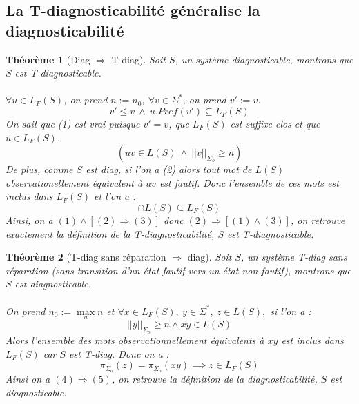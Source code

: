 \documentclass[conference]{IEEEtran}
\newtheorem{myth}{Th\'eor\`eme}
\begin{document}
\subsection{La T-diagnosticabilité généralise la diagnosticabilité}

\begin{myth}[Diag $\Rightarrow$ T-diag]

Soit $S$, un système diagnosticable, montrons que $S$ est T-diagnosticable. 
\paragraph{}
\noindent $\forall u \in L_{F}(S)$, on prend $n := n_0$, $\forall v \in \Sigma^*$, on prend $v' := v$. 
\begin{equation}
v'\leq v \ \wedge \  u.Pref(v') \subseteq L_F(S)
\end{equation}
On sait que (1) est vrai puisque $v'=v$, que $L_F(S)$ est suffixe clos et que $u \in L_F(S)$.
\begin{equation}
(uv \in L(S) \ \wedge \  ||v||_{\Sigma_o}\geq n)
\end{equation}
De plus, comme $S$ est diag, si l'on a (2) alors tout mot de $L(S)$ observationellement équivalent à $uv$ est fautif. Donc l'ensemble de ces mots est inclus dans $L_F(S)$ et l'on a :
\begin{equation}
[uv'] \cap L(S) \subseteq L_F(S)
\end{equation}
Ainsi, on a $(1) \wedge [ (2)  \Rightarrow (3) ]$ donc $(2)  \Rightarrow [ (1) \wedge (3) ]$, on retrouve exactement la définition de la T-diagnosticabilité, $S$ est T-diagnosticable.
\end{myth}
\begin{myth}[T-diag sans r\'eparation $\Rightarrow$ diag]
Soit $S$, un système T-diag sans réparation (sans transition d'un état fautif vers un état non fautif), montrons que $S$ est diagnosticable.
\paragraph{}
\noindent On prend $n_0:= \max\limits_{u} n$ et
$\forall x \in L_F(S),\ y \in \Sigma^*,\ z \in L(S),$ si l'on a :
\begin{equation}
||y||_{\Sigma_o} \ge n \land xy \in  L(S) 
\end{equation}
Alors l'ensemble des mots observationnellement équivalents à $xy$ est inclus dans $L_F(S)$ car $S$ est T-diag. Donc on a :
\begin{equation}
 \pi_{\Sigma_o}(z)=\pi_{\Sigma_o}(xy) \implies z \in L_F(S)
\end{equation}
Ainsi on a $(4) \Rightarrow (5)$, on retrouve la définition de la diagnosticabilité, $S$ est diagnosticable.
\end{myth}
\end{document}
